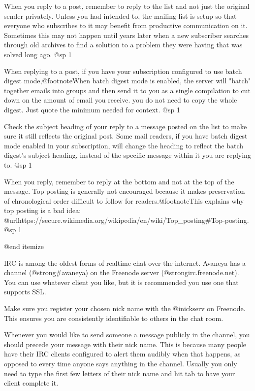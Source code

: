 \item
When you reply to a post, remember to reply to the list and not just the original sender privately. Unless you had intended to, the mailing list is setup so that everyone who subscribes to it may benefit from productive communication on it. Sometimes this may not happen until years later when a new subscriber searches through old archives to find a solution to a problem they were having that was solved long ago.
@sp 1

\item
When replying to a post, if you have your subscription configured to use batch digest mode,@footnote{When batch digest mode is enabled, the server will "batch" together emails into groups and then send it to you as a single compilation to cut down on the amount of email you receive.} you do not need to copy the whole digest. Just quote the minimum needed for context.
@sp 1

\item
Check the subject heading of your reply to a message posted on the list to make sure it still reflects the original post. Some mail readers, if you have batch digest mode enabled in your subscription, will change the heading to reflect the batch digest's subject heading, instead of the specific message within it you are replying to.
@sp 1

\item
When you reply, remember to reply at the bottom and not at the top of the message. Top posting is generally not encouraged because it makes preservation of chronological order difficult to follow for readers.@footnote{This explains why top posting is a bad idea: @url{https://secure.wikimedia.org/wikipedia/en/wiki/Top_posting#Top-posting}.}
@sp 1

@end itemize


IRC is among the oldest forms of realtime chat over the internet. Avaneya has a channel (@strong{#avaneya}) on the Freenode server (@strong{irc.freenode.net}). You can use whatever client you like, but it is recommended you use one that supports SSL.

Make sure you register your chosen nick name with the @i{nickserv} on Freenode. This ensures you are consistently identifiable to others in the chat room.

Whenever you would like to send someone a message publicly in the channel, you should precede your message with their nick name. This is because many people have their IRC clients configured to alert them audibly when that happens, as opposed to every time anyone says anything in the channel. Usually you only need to type the first few letters of their nick name and hit tab to have your client complete it.


